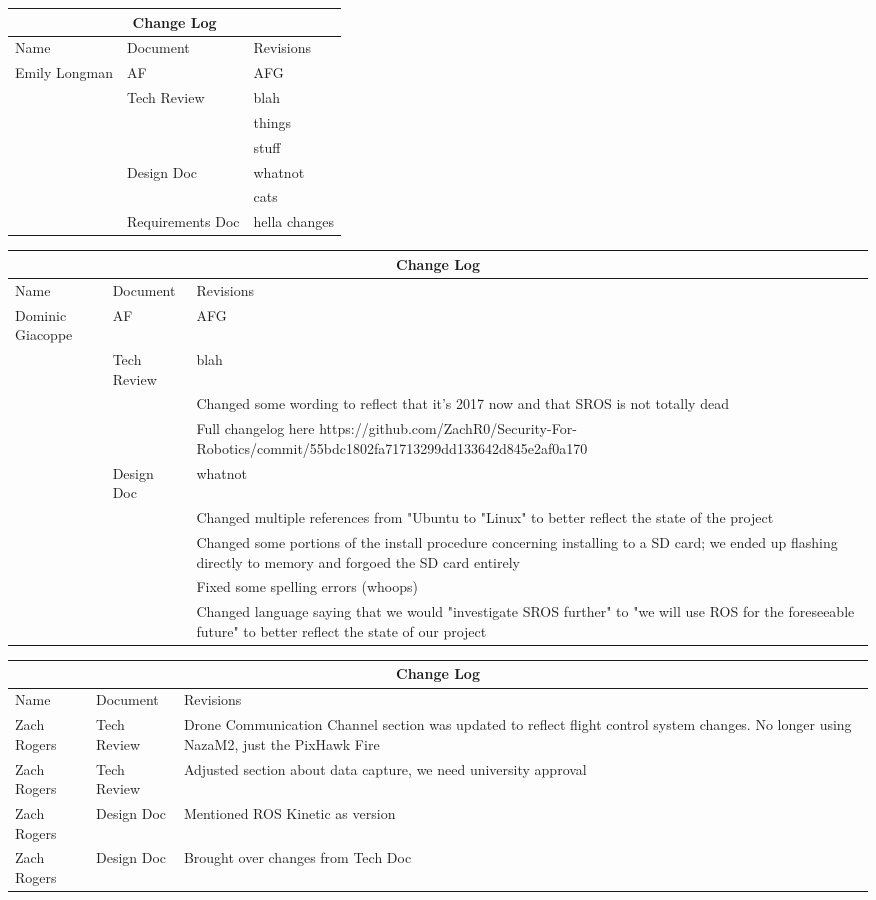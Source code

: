 \documentclass[IEEEtran,letterpaper,10pt,titlepage,draftclsnofoot,onecolumn]{article}
\begin{document}
\begin{tabular}{ |p{3cm}|p{3cm}|p{3cm}|  }
\hline
\multicolumn{3}{|c|}{Change Log} \\
\hline
Name & Document & Revisions \\
\hline
Emily Longman & AF &AFG \\
& Tech Review & blah \\
& & things \\
& & stuff \\
& Design Doc & whatnot \\
& & cats \\
& Requirements Doc & hella changes \\
\hline
\end{tabular}

\begin{tabular}{ |p{3cm}|p{3cm}|p{3cm}|  }
\hline
\multicolumn{3}{|c|}{Change Log} \\
\hline
Name & Document & Revisions \\
\hline
Dominic Giacoppe & AF &AFG \\
& Tech Review & blah \\
& & Changed some wording to reflect that it's 2017 now and that SROS is not totally dead \\
& & Full changelog here https://github.com/ZachR0/Security-For-Robotics/commit/55bdc1802fa71713299dd133642d845e2af0a170 \\
& Design Doc & whatnot \\
& & Changed multiple references from "Ubuntu to "Linux" to better reflect the state of the project \\
& & Changed some portions of the install procedure concerning installing to a SD card; we ended up flashing directly to memory and forgoed the SD card entirely \\
& & Fixed some spelling errors (whoops) \\
& & Changed language saying that we would "investigate SROS further" to "we will use ROS for the foreseeable future" to better reflect the state of our project \\
\hline
\end{tabular}

\begin{tabular}{ |p{3cm}|p{3cm}|p{3cm}|  }
\hline
\multicolumn{3}{|c|}{Change Log} \\
\hline
Name & Document & Revisions \\
\hline
Zach Rogers & Tech Review & Drone Communication Channel section was updated to reflect flight control system changes. No longer using NazaM2, just the PixHawk Fire \\
Zach Rogers & Tech Review & Adjusted section about data capture, we need university approval \\
Zach Rogers & Design Doc & Mentioned ROS Kinetic as version \\
Zach Rogers & Design Doc & Brought over changes from Tech Doc \\
\hline
\end{tabular}
\end{document}
